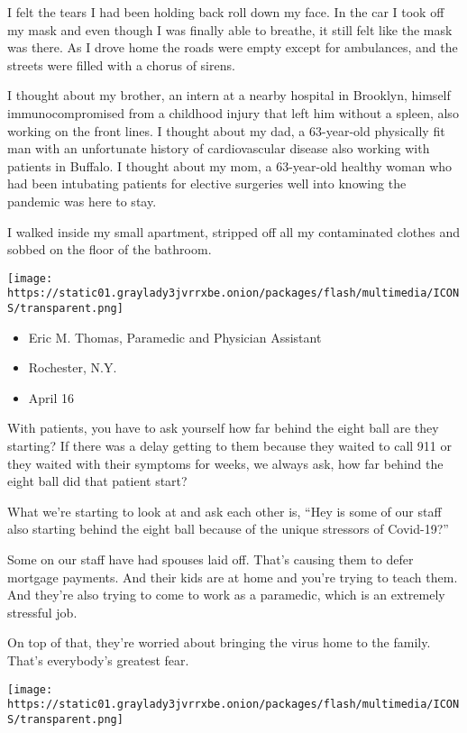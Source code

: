 I felt the tears I had been holding back roll down my face. In the car I
took off my mask and even though I was finally able to breathe, it still
felt like the mask was there. As I drove home the roads were empty
except for ambulances, and the streets were filled with a chorus of
sirens.

I thought about my brother, an intern at a nearby hospital in Brooklyn,
himself immunocompromised from a childhood injury that left him without
a spleen, also working on the front lines. I thought about my dad, a
63-year-old physically fit man with an unfortunate history of
cardiovascular disease also working with patients in Buffalo. I thought
about my mom, a 63-year-old healthy woman who had been intubating
patients for elective surgeries well into knowing the pandemic was here
to stay.

I walked inside my small apartment, stripped off all my contaminated
clothes and sobbed on the floor of the bathroom.

\texttt{[image: https://static01.graylady3jvrrxbe.onion/packages/flash/multimedia/ICONS/transparent.png]}

\begin{itemize}
\tightlist
\item
  Eric M. Thomas, Paramedic and Physician Assistant
\item
  Rochester, N.Y.
\item
  April 16
\end{itemize}

With patients, you have to ask yourself how far behind the eight ball
are they starting? If there was a delay getting to them because they
waited to call 911 or they waited with their symptoms for weeks, we
always ask, how far behind the eight ball did that patient start?

What we're starting to look at and ask each other is, ``Hey is some of
our staff also starting behind the eight ball because of the unique
stressors of Covid-19?''

Some on our staff have had spouses laid off. That's causing them to
defer mortgage payments. And their kids are at home and you're trying to
teach them. And they're also trying to come to work as a paramedic,
which is an extremely stressful job.

On top of that, they're worried about bringing the virus home to the
family. That's everybody's greatest fear.

\texttt{[image: https://static01.graylady3jvrrxbe.onion/packages/flash/multimedia/ICONS/transparent.png]}

